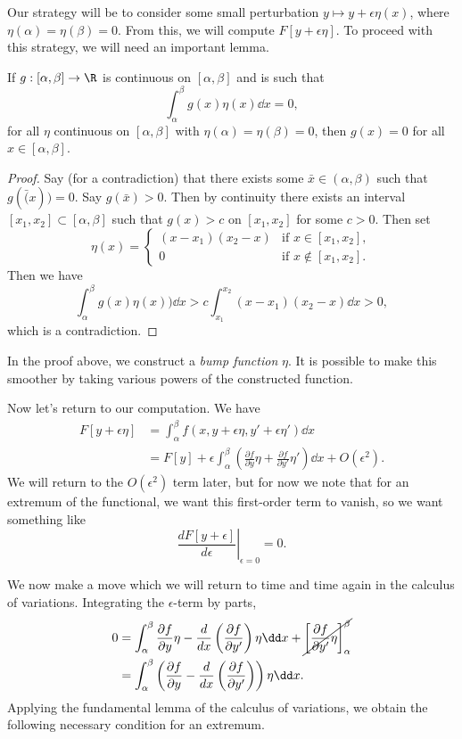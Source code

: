\documentclass[a4paper]{scrartcl}
\begin{document}
Our strategy will be to consider some small perturbation $y \mapsto y + \epsilon \eta(x)$, where $\eta(\alpha) = \eta(\beta) = 0$. From this, we will compute $F[y + \epsilon \eta]$. To proceed with this strategy, we will need an important lemma.

\begin{lemma}
	If $g: [\alpha, \beta] \rightarrow \R$ is continuous on $[\alpha, \beta]$ and is such that
	$$
	\int_{\alpha}^{\beta} g(x) \eta(x) \dd x = 0,
	$$
	for all $\eta$ continuous on $[\alpha, \beta]$ with $\eta(\alpha) = \eta(\beta) = 0$, then $g(x) = 0$ for all $x \in [\alpha, \beta]$.
\end{lemma}
\begin{proof}
	Say (for a contradiction) that there exists some $\bar{x} \in (\alpha, \beta)$ such that $g(\bar(x)) = 0$. Say $g(\bar{x}) > 0$. Then by continuity there exists an interval $[x_1, x_2] \subset [\alpha, \beta]$ such that $g(x) > c$ on $[x_1, x_2]$ for some $c > 0$. Then set
	$$
	\eta(x) = 
	\begin{cases}
		(x - x_1)(x_2 - x) &\mbox{if } x \in [x_1, x_2], \\
		0 &\mbox{if } x \not \in [x_1, x_2].
	   \end{cases}
	$$
	Then we have
	$$
	   \int_\alpha^\beta g(x) \eta(x)) \dd x > c \int_{x_1}^{x_2} (x - x_1)(x_2 - x) \dd x > 0,
	$$
	which is a contradiction.
\end{proof}

\begin{remark}
	In the proof above, we construct a \emph{bump function} $\eta$. It is possible to make this smoother by taking various powers of the constructed function.
\end{remark}

Now let's return to our computation. We have
\begin{align*}
	F[y + \epsilon \eta] &= \int_{\alpha}^{\beta} f(x, y + \epsilon \eta, y' + \epsilon \eta') \dd x \\
	&= F[y] + \epsilon \int_{\alpha}^{\beta} \left(\frac{\partial f}{\partial y} \eta + \frac{\partial f}{\partial y'} \eta '\right) \dd x + O(\epsilon^2).
\end{align*}
We will return to the $O(\epsilon^2)$ term later, but for now we note that for an extremum of the functional, we want this first-order term to vanish, so we want something like 
$$
\left.\frac{dF[y + \epsilon]}{d\epsilon}\right|_{\epsilon = 0} = 0.
$$

We now make a move which we will return to time and time again in the calculus of variations. Integrating the $\epsilon$-term by parts,
\begin{align*}
	0 &= \int_{\alpha}^{\beta} \frac{\partial f}{\partial y} \eta - \frac{d}{dx} \left(\frac{\partial f}{\partial y'}\right) \eta \dd x + \cancel{\left[\frac{\partial f}{\partial y'}\eta\right]_{\alpha}^{\beta}} \\
	&= \int_{\alpha}^{\beta} \left(\frac{\partial f}{\partial y} - \frac{d}{dx} \left(\frac{\partial f}{\partial y'}\right)\right) \eta \dd x.
\end{align*}
Applying the fundamental lemma of the calculus of variations, we obtain the following necessary condition for an extremum.
\end{document}
